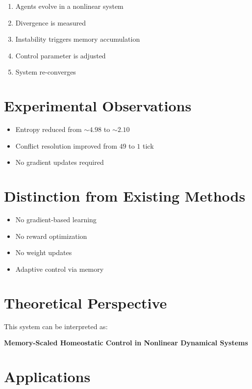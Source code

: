 \documentclass[11pt]{article}
\begin{document}
\begin{enumerate}
\item Agents evolve in a nonlinear system
\item Divergence is measured
\item Instability triggers memory accumulation
\item Control parameter is adjusted
\item System re-converges
\end{enumerate}

\section{Experimental Observations}

\begin{itemize}
\item Entropy reduced from $\sim 4.98$ to $\sim 2.10$
\item Conflict resolution improved from $49$ to $1$ tick
\item No gradient updates required
\end{itemize}

\section{Distinction from Existing Methods}

\begin{itemize}
\item No gradient-based learning
\item No reward optimization
\item No weight updates
\item Adaptive control via memory
\end{itemize}

\section{Theoretical Perspective}

This system can be interpreted as:

\begin{center}
\textbf{Memory-Scaled Homeostatic Control in Nonlinear Dynamical Systems}
\end{center}

\section{Applications}
\end{document}
